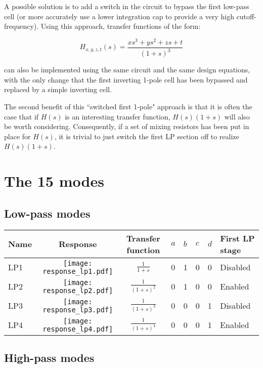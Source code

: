 \documentclass[a4paper,10pt]{article}
\begin{document}
A possible solution is to add a switch in the circuit to bypass the first low-pass cell (or more accurately use a lower integration cap to provide a very high cutoff-frequency). Using this approach, transfer functions of the form:

$$H_{x, y, z, t}(s) = \frac{x s^3 + y s^2 + z s + t}{(1 + s)^3}$$

can also be implemented using the same circuit and the same design equations, with the only change that the first inverting 1-pole cell has been bypassed and replaced by a simple inverting cell.

The second benefit of this ``switched first 1-pole" approach is that it is often the case that if $H(s)$ is an interesting transfer function, $H(s) (1 + s)$ will also be worth considering. Consequently, if a set of mixing resistors has been put in place for $H(s)$, it is trivial to just switch the first LP section off to realize $H(s) (1 + s)$.

\section{The 15 modes}

\subsection{Low-pass modes}

\begin{tabular}{lcclllll}
\hline
Name & Response & Transfer function & $a$ & $b$ & $c$ & $d$ & First LP stage \\
\hline
LP1 & \texttt{[image: response\_lp1.pdf]} & $\frac{1}{1 + s}$ & 0 & 1 & 0 & 0 & Disabled \\
\hline
LP2 & \texttt{[image: response\_lp2.pdf]} & $\frac{1}{(1 + s)^2}$ & 0 & 1 & 0 & 0 & Enabled \\
\hline
LP3 & \texttt{[image: response\_lp3.pdf]} & $\frac{1}{(1 + s)^3}$ & 0 & 0 & 0 & 1 & Disabled \\
\hline
LP4 & \texttt{[image: response\_lp4.pdf]} & $\frac{1}{(1 + s)^4}$ & 0 & 0 & 0 & 1 & Enabled \\
\hline
\end{tabular}

\subsection{High-pass modes}
\end{document}
